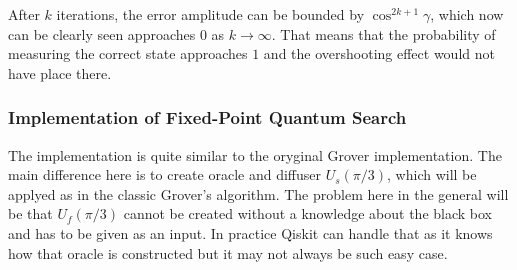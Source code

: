 \bigskip
After $k$ iterations, the error amplitude can be bounded by $\cos^{2k+1}\gamma$, which now can be clearly seen approaches $0$ 
as $k \to \infty$. That means that the probability of measuring the correct state approaches $1$ and the overshooting effect would not have place there.
%
%

\subsubsection{Implementation of Fixed-Point Quantum Search}

The implementation is quite similar to the oryginal Grover implementation. 
The main difference here is to create oracle and diffuser $U_s(\pi/3)$, which will be applyed as in the classic Grover's algorithm. The problem here in the general 
will be that $U_f(\pi/3)$ cannot be created without a knowledge about the black box and has to be given as an input. In practice Qiskit can handle that as it knows how that 
oracle is constructed but it may not always be such easy case.
%
%

\newpage

